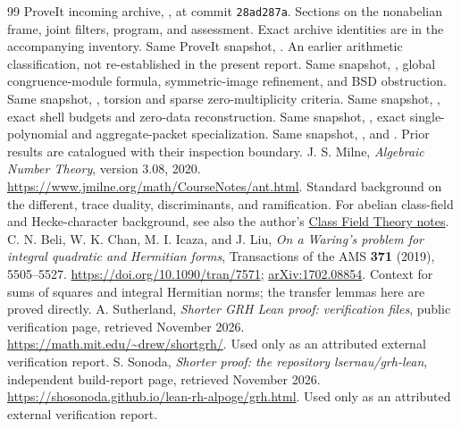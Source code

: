 \begin{thebibliography}{99}
 ProveIt incoming archive, , at commit \texttt{28ad287a}. Sections on the nonabelian frame, joint filters, program, and assessment. Exact archive identities are in the accompanying inventory.
 Same ProveIt snapshot, . An earlier arithmetic classification, not re-established in the present report.
 Same snapshot, , global congruence-module formula, symmetric-image refinement, and BSD obstruction.
 Same snapshot, , torsion and sparse zero-multiplicity criteria.
 Same snapshot, , exact shell budgets and zero-data reconstruction.
 Same snapshot, , exact single-polynomial and aggregate-packet specialization.
 Same snapshot, , and . Prior results are catalogued with their inspection boundary.
 J. S. Milne, \emph{Algebraic Number Theory}, version 3.08, 2020. \url{https://www.jmilne.org/math/CourseNotes/ant.html}. Standard background on the different, trace duality, discriminants, and ramification. For abelian class-field and Hecke-character background, see also the author's \href{https://www.jmilne.org/math/CourseNotes/cft.html}{Class Field Theory notes}.
 C. N. Beli, W. K. Chan, M. I. Icaza, and J. Liu, \emph{On a Waring's problem for integral quadratic and Hermitian forms}, Transactions of the AMS \textbf{371} (2019), 5505--5527. \url{https://doi.org/10.1090/tran/7571}; \href{https://arxiv.org/abs/1702.08854}{arXiv:1702.08854}. Context for sums of squares and integral Hermitian norms; the transfer lemmas here are proved directly.
 A. Sutherland, \emph{Shorter GRH Lean proof: verification files}, public verification page, retrieved November 2026. \url{https://math.mit.edu/~drew/shortgrh/}. Used only as an attributed external verification report.
 S. Sonoda, \emph{Shorter proof: the repository lsernau/grh-lean}, independent build-report page, retrieved November 2026. \url{https://shosonoda.github.io/lean-rh-alpoge/grh.html}. Used only as an attributed external verification report.
\end{thebibliography}

